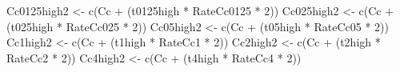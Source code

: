 \documentclass[
]{krantz}
\makeatletter
\newenvironment{Shaded}{\begin{snugshade}}{\end{snugshade}}
\newcommand{\DecValTok}[1]{\textcolor[rgb]{0.00,0.00,0.81}{#1}}
\newcommand{\FunctionTok}[1]{\textcolor[rgb]{0.00,0.00,0.00}{#1}}
\newcommand{\NormalTok}[1]{#1}
\newcommand{\OtherTok}[1]{\textcolor[rgb]{0.56,0.35,0.01}{#1}}
\newcommand{\SpecialCharTok}[1]{\textcolor[rgb]{0.00,0.00,0.00}{#1}}
\newenvironment{kframe}{%
\medskip{}
\setlength{\fboxsep}{.8em}
 \def\at@end@of@kframe{}%
 \ifinner\ifhmode%
  \def\at@end@of@kframe{\end{minipage}}%
  \begin{minipage}{\columnwidth}%
 \fi\fi%
 \def\FrameCommand##1{\hskip\@totalleftmargin \hskip-\fboxsep
 \colorbox{shadecolor}{##1}\hskip-\fboxsep
     \hskip-\linewidth \hskip-\@totalleftmargin \hskip\columnwidth}%
 \MakeFramed {\advance\hsize-\width
   \@totalleftmargin\z@ \linewidth\hsize
   \@setminipage}}%
 {\par\unskip\endMakeFramed%
 \at@end@of@kframe}
\renewenvironment{Shaded}{\begin{kframe}}{\end{kframe}}
\makeatother
\begin{document}
\begin{Shaded}
\begin{Highlighting}[]
\NormalTok{Cc0125high2 }\OtherTok{\textless{}{-}} \FunctionTok{c}\NormalTok{(Cc }\SpecialCharTok{+}\NormalTok{ (t0125high }\SpecialCharTok{*}\NormalTok{ RateCc0125 }\SpecialCharTok{*} \DecValTok{2}\NormalTok{))}
\NormalTok{Cc025high2 }\OtherTok{\textless{}{-}} \FunctionTok{c}\NormalTok{(Cc }\SpecialCharTok{+}\NormalTok{ (t025high }\SpecialCharTok{*}\NormalTok{ RateCc025 }\SpecialCharTok{*} \DecValTok{2}\NormalTok{))}
\NormalTok{Cc05high2 }\OtherTok{\textless{}{-}} \FunctionTok{c}\NormalTok{(Cc }\SpecialCharTok{+}\NormalTok{ (t05high }\SpecialCharTok{*}\NormalTok{ RateCc05 }\SpecialCharTok{*} \DecValTok{2}\NormalTok{))}
\NormalTok{Cc1high2 }\OtherTok{\textless{}{-}} \FunctionTok{c}\NormalTok{(Cc }\SpecialCharTok{+}\NormalTok{ (t1high }\SpecialCharTok{*}\NormalTok{ RateCc1 }\SpecialCharTok{*} \DecValTok{2}\NormalTok{))}
\NormalTok{Cc2high2 }\OtherTok{\textless{}{-}} \FunctionTok{c}\NormalTok{(Cc }\SpecialCharTok{+}\NormalTok{ (t2high }\SpecialCharTok{*}\NormalTok{ RateCc2 }\SpecialCharTok{*} \DecValTok{2}\NormalTok{))}
\NormalTok{Cc4high2 }\OtherTok{\textless{}{-}} \FunctionTok{c}\NormalTok{(Cc }\SpecialCharTok{+}\NormalTok{ (t4high }\SpecialCharTok{*}\NormalTok{ RateCc4 }\SpecialCharTok{*} \DecValTok{2}\NormalTok{))}


\end{Highlighting}
\end{Shaded}
\end{document}
